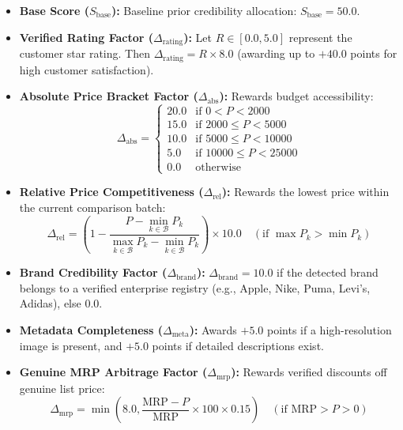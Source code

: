 \documentclass[12pt,a4paper,oneside]{report}
\begin{document}
\begin{itemize}
    \item \textbf{Base Score ($S_{\text{base}}$):} Baseline prior credibility allocation: $S_{\text{base}} = 50.0$.
    \item \textbf{Verified Rating Factor ($\Delta_{\text{rating}}$):} Let $R \in [0.0, 5.0]$ represent the customer star rating. Then $\Delta_{\text{rating}} = R \times 8.0$ (awarding up to $+40.0$ points for high customer satisfaction).
    \item \textbf{Absolute Price Bracket Factor ($\Delta_{\text{abs}}$):} Rewards budget accessibility:
    \begin{equation}
    \Delta_{\text{abs}} = \begin{cases}
    20.0 & \text{if } 0 < P < 2000 \\
    15.0 & \text{if } 2000 \le P < 5000 \\
    10.0 & \text{if } 5000 \le P < 10000 \\
    5.0 & \text{if } 10000 \le P < 25000 \\
    0.0 & \text{otherwise}
    \end{cases}
    \end{equation}
    \item \textbf{Relative Price Competitiveness ($\Delta_{\text{rel}}$):} Rewards the lowest price within the current comparison batch:
    \begin{equation}
    \Delta_{\text{rel}} = \left(1 - \frac{P - \min_{k \in \mathcal{B}} P_k}{\max_{k \in \mathcal{B}} P_k - \min_{k \in \mathcal{B}} P_k}\right) \times 10.0 \quad (\text{if } \max P_k > \min P_k)
    \end{equation}
    \item \textbf{Brand Credibility Factor ($\Delta_{\text{brand}}$):} $\Delta_{\text{brand}} = 10.0$ if the detected brand belongs to a verified enterprise registry (e.g., Apple, Nike, Puma, Levi's, Adidas), else $0.0$.
    \item \textbf{Metadata Completeness ($\Delta_{\text{meta}}$):} Awards $+5.0$ points if a high-resolution image is present, and $+5.0$ points if detailed descriptions exist.
    \item \textbf{Genuine MRP Arbitrage Factor ($\Delta_{\text{mrp}}$):} Rewards verified discounts off genuine list price:
    \begin{equation}
    \Delta_{\text{mrp}} = \min\left(8.0, \frac{\text{MRP} - P}{\text{MRP}} \times 100 \times 0.15\right) \quad (\text{if } \text{MRP} > P > 0)
    \end{equation}
\end{itemize}
\end{document}
